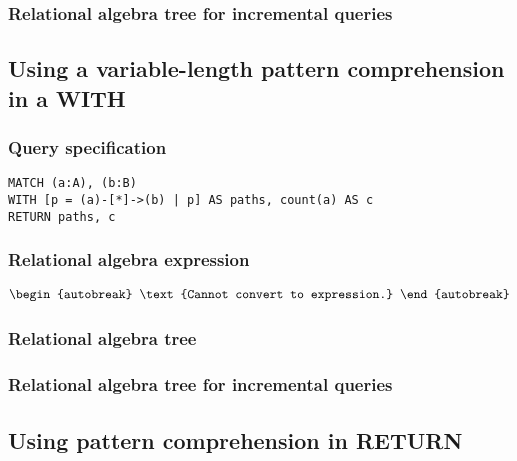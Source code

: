 \subsubsection*{Relational algebra tree for incremental queries}


\subsection{Using a variable-length pattern comprehension in a WITH}

\subsubsection*{Query specification}

\begin{lstlisting}
MATCH (a:A), (b:B)
WITH [p = (a)-[*]->(b) | p] AS paths, count(a) AS c
RETURN paths, c
\end{lstlisting}

\subsubsection*{Relational algebra expression}

\begin{align*}
\begin{autobreak}
\text{Cannot convert to expression.}
\end{autobreak}
\end{align*}

\subsubsection*{Relational algebra tree}


\subsubsection*{Relational algebra tree for incremental queries}


\subsection{Using pattern comprehension in RETURN}

